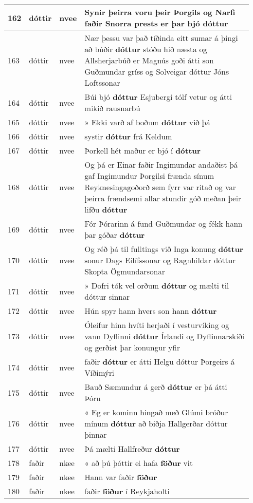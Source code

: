 \documentclass{article}
\begin{document}
\begin{longtable}{p{1cm}|p{1cm}|p{1cm}|p{13cm}}
\hline
162&dóttir&nvee&Synir þeirra voru þeir Þorgils og Narfi faðir Snorra prests er þar bjó \textbf{dóttur} \\
\hline
163&dóttir&nvee&Nær þessu var það tíðinda eitt sumar á þingi að búðir \textbf{dóttur} stóðu hið næsta og Allsherjarbúð er Magnús goði átti son Guðmundar gríss og Solveigar dóttur Jóns Loftssonar\\
\hline
164&dóttir&nvee&Búi bjó \textbf{dóttur} Esjubergi tólf vetur og átti mikið rausnarbú\\
\hline
165&dóttir&nvee&» Ekki varð af boðum \textbf{dóttur} við þá\\
\hline
166&dóttir&nvee&systir \textbf{dóttur} frá Keldum\\
\hline
167&dóttir&nvee&Þorkell hét maður er bjó í \textbf{dóttur} \\
\hline
168&dóttir&nvee&Og þá er Einar faðir Ingimundar andaðist þá gaf Ingimundur Þorgilsi frænda sínum Reyknesingagoðorð sem fyrr var ritað og var þeirra frændsemi allar stundir góð meðan þeir lifðu \textbf{dóttur} \\
\hline
169&dóttir&nvee&Fór Þórarinn á fund Guðmundar og fékk hann þar góðar \textbf{dóttur} \\
\hline
170&dóttir&nvee&Og réð þá til fulltings við Inga konung \textbf{dóttur} sonur Dags Eilífssonar og Ragnhildar dóttur Skopta Ögmundarsonar\\
\hline
171&dóttir&nvee&» Dofri tók vel orðum \textbf{dóttur} og mælti til dóttur sinnar\\
\hline
172&dóttir&nvee&Hún spyr hann hvers son hann \textbf{dóttur} \\
\hline
173&dóttir&nvee&Óleifur hinn hvíti herjaði í vesturvíking og vann Dyflinni \textbf{dóttur} Írlandi og Dyflinnarskíði og gerðist þar konungur yfir\\
\hline
174&dóttir&nvee&faðir \textbf{dóttur} er átti Helgu dóttur Þorgeirs á Víðimýri\\
\hline
175&dóttir&nvee&Bauð Sæmundur á gerð \textbf{dóttur} er þá átti Þóru\\
\hline
176&dóttir&nvee&« Eg er kominn hingað með Glúmi bróður mínum \textbf{dóttur} að biðja Hallgerðar dóttur þinnar\\
\hline
177&dóttir&nvee&Þá mælti Hallfreður \textbf{dóttur} \\
\hline
178&faðir&nkee&« að þú þóttir ei hafa \textbf{föður} vit\\
\hline
179&faðir&nkee&Hann var faðir \textbf{föður} \\
\hline
180&faðir&nkee&faðir \textbf{föður} í Reykjaholti\\

\end{longtable}
\end{document}
